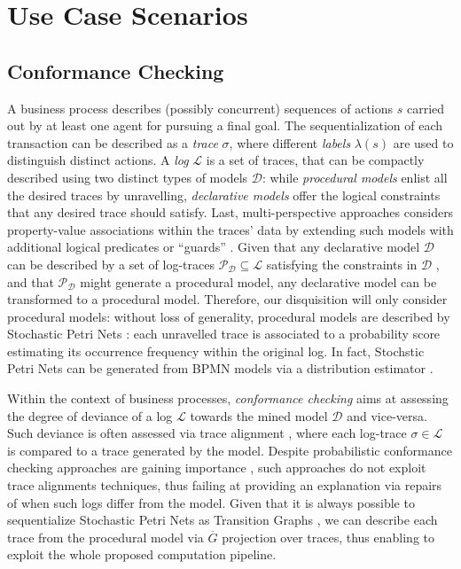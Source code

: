 \section{Use Case Scenarios}
\subsection{Conformance Checking}
A business process describes (possibly concurrent) sequences of actions $s$ carried out by at least one agent for pursuing a final goal. The sequentialization of each transaction can be described as a \textit{trace} $\sigma$, where different \textit{labels} $\lambda(s)$ are used to distinguish distinct actions. A \textit{log} $\mathcal{L}$ is a set of traces, that can be compactly described using two distinct types of models $\mathcal{D}$: while \textit{procedural models} \cite{DBLP:journals/tosem/PolyvyanyySWCM20} %
 enlist all the desired traces by unravelling,  \textit{declarative models} \cite{BurattinMAS12} offer the logical constraints that any desired trace should satisfy.  Last, multi-perspective approaches considers property-value associations within the traces' data by extending such models with additional logical predicates \cite{GiacomoMGMM14} or ``guards'' \cite{MannhardtLRA16}. Given that any declarative model $\mathcal{D}$ can be described by a set of log-traces $\mathcal{P}_\mathcal{D}\subseteq\mathcal{L}$ satisfying the constraints in $\mathcal{D}$ \cite{LeoniMA12}, and that $\mathcal{P}_\mathcal{D}$ might generate a procedural model, any declarative model can be transformed to a procedural model. Therefore, our disquisition will only consider procedural models: without loss of generality, procedural models are described by Stochastic Petri Nets \cite{MarsanCB84}: each unravelled trace is associated to a probability score estimating its occurrence frequency within the original log. In fact, Stochstic Petri Nets can be generated from BPMN models \cite{RaedtsPUWGS07} via a distribution estimator \cite{spdwe}. 

Within the context of business processes, \textit{conformance checking} aims at assessing the degree of deviance of a log $\mathcal{L}$ towards the mined model $\mathcal{D}$ and vice-versa. Such deviance is often assessed via trace alignment \cite{DBLP:conf/edoc/AdriansyahDA11}, where each log-trace $\sigma\in\mathcal{L}$ is compared to a trace generated by the model. Despite probabilistic conformance checking approaches are gaining importance \cite{DBLP:conf/bpm/LeemansSA19,DBLP:conf/icpm/PolyvyanyyK19,DBLP:journals/tosem/PolyvyanyySWCM20}, such approaches do not exploit trace alignments techniques, thus failing at providing an explanation via repairs of when such logs differ from the model. Given that it is always possible to sequentialize Stochastic Petri Nets as Transition Graphs \cite{MarsanCB84}, we can describe each trace from the procedural model via $\overline{G}$ projection over traces, thus enabling to exploit the whole proposed computation pipeline.



